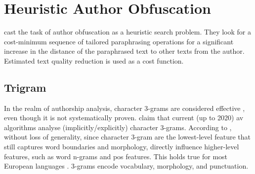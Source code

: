 \section{Heuristic Author Obfuscation}
\label{sec:heuristic_author_obfuscation}

\citet{bevendorff_divergence_based_2020} cast the task of author obfuscation as a heuristic search problem.
They look for a cost-minimum sequence of tailored paraphrasing operations for a significant increase in the distance 
of the paraphrased text to other texts from the author.
Estimated text quality reduction is used as a cost function.

\subsection{Trigram}
In the realm of authorship analysis, character 3-grams are considered effective \citep{bevendorff_divergence_based_2020}, 
even though it is not systematically proven.
\citet{bevendorff_divergence_based_2020} claim that current (up to 2020) \ac{av} algorithms analyse (implicitly/explicitly) 
character 3-grams.
According to \citet{bevendorff_divergence_based_2020}, without loss of generality, since character 3-gram are the lowest-level feature that 
still captures word boundaries and morphology, %
directly influence higher-level features, such as word n-grams and \ac{pos} features.
This holds true for most European languages \citep{bevendorff_divergence_based_2020}.
3-grams encode vocabulary, morphology, and punctuation.

